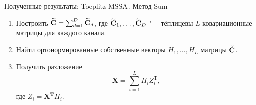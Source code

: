 \documentclass[ucs, notheorems, handout]{beamer}
\begin{document}
\begin{frame}{Полученные результаты: Toeplitz MSSA. Метод Sum}
	\begin{enumerate}
		\item Построить $\widetilde{\mathbf{C}}=\sum_{d=1}^D \widetilde{\mathbf{C}}_d$, где $\widetilde{\mathbf{C}}_1,\ldots,\widetilde{\mathbf{C}}_D$ "--- тёплицевы $L$-ковариационные матрицы для каждого канала.\medskip
		\item Найти ортонормированные собственные векторы $H_1,\ldots,H_L$ матрицы $\widetilde{\mathbf{C}}$.\medskip
		\item Получить разложение
		\begin{equation}\label{eq:sum_decomposition}
			\mathbf{X}=\sum_{i=1}^L H_i Z_i^\mathrm{T},
		\end{equation}
		где $Z_i=\mathbf{X^T}H_i$.
	\end{enumerate}
\end{frame}
\end{document}
